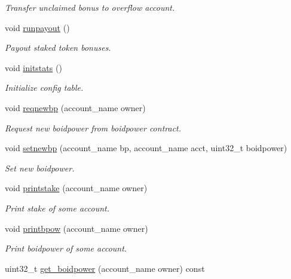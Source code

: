 \begin{DoxyCompactItemize}
\begin{DoxyCompactList}\small\item\em Transfer unclaimed bonus to overflow account. \end{DoxyCompactList}\item 
void \hyperlink{classboidtoken_a13044fb384103ca5d14029b8aa4fd8bf}{runpayout} ()\hypertarget{classboidtoken_a13044fb384103ca5d14029b8aa4fd8bf}{}\label{classboidtoken_a13044fb384103ca5d14029b8aa4fd8bf}

\begin{DoxyCompactList}\small\item\em Payout staked token bonuses. \end{DoxyCompactList}\item 
void \hyperlink{classboidtoken_ab4f795e1a6d8b363b11c50c50fa00f4b}{initstats} ()\hypertarget{classboidtoken_ab4f795e1a6d8b363b11c50c50fa00f4b}{}\label{classboidtoken_ab4f795e1a6d8b363b11c50c50fa00f4b}

\begin{DoxyCompactList}\small\item\em Initialize config table. \end{DoxyCompactList}\item 
void \hyperlink{classboidtoken_ae5b8eafdb3f1790ef7e601ffb84ff0f7}{reqnewbp} (account\+\_\+name owner)\hypertarget{classboidtoken_ae5b8eafdb3f1790ef7e601ffb84ff0f7}{}\label{classboidtoken_ae5b8eafdb3f1790ef7e601ffb84ff0f7}

\begin{DoxyCompactList}\small\item\em Request new boidpower from boidpower contract. \end{DoxyCompactList}\item 
void \hyperlink{classboidtoken_ae809d2f3f59bd73775d2ac045b0e0134}{setnewbp} (account\+\_\+name bp, account\+\_\+name acct, uint32\+\_\+t boidpower)
\begin{DoxyCompactList}\small\item\em Set new boidpower. \end{DoxyCompactList}\item 
void \hyperlink{classboidtoken_a6e07ac72952b33000b7ab1ff59349d2c}{printstake} (account\+\_\+name owner)
\begin{DoxyCompactList}\small\item\em Print stake of some account. \end{DoxyCompactList}\item 
void \hyperlink{classboidtoken_a611d76eed90fab922d571e04bc2b2fd8}{printbpow} (account\+\_\+name owner)
\begin{DoxyCompactList}\small\item\em Print boidpower of some account. \end{DoxyCompactList}\item 
uint32\+\_\+t \hyperlink{classboidtoken_a58d339c0c3a01a7b046ca250d59bf80f}{get\+\_\+boidpower} (account\+\_\+name owner) const \hypertarget{classboidtoken_a58d339c0c3a01a7b046ca250d59bf80f}{}\label{classboidtoken_a58d339c0c3a01a7b046ca250d59bf80f}


\end{DoxyCompactItemize}

